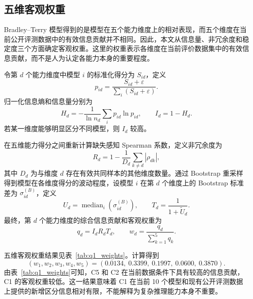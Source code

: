 \subsection{五维客观权重}

Bradley--Terry 模型得到的是模型在五个能力维度上的相对表现，而五个维度在当前公开评测数据中的有效信息贡献并不相同。因此，本文从信息量、非冗余度和稳定度三个方面确定客观权重。这里的权重表示各维度在当前评价数据集中的有效信息贡献，而不是人为认定各能力本身的重要程度。

令第 \(d\) 个能力维度中模型 \(i\) 的标准化得分为 \(S_{id}\)，定义
\begin{equation}
p_{id}
=
\frac{S_{id}+\varepsilon}
{\sum_i(S_{id}+\varepsilon)}.
\label{eq:q1_information_p}
\end{equation}
归一化信息熵和信息量分别为
\begin{equation}
H_d
=
-\frac{1}{\ln n_d}
\sum_i p_{id}\ln p_{id},
\qquad
I_d=1-H_d.
\label{eq:q1_information}
\end{equation}
若某一维度能够明显区分不同模型，则 \(I_d\) 较高。

在五维能力得分之间重新计算缺失感知 Spearman 系数，定义非冗余度为
\begin{equation}
R_d
=
1-
\frac{1}{D_d}
\sum_{k\neq d}
|\rho_{dk}|,
\label{eq:q1_redundancy}
\end{equation}
其中 \(D_d\) 为与维度 \(d\) 存在有效共同样本的其他维度数量。通过 Bootstrap 重采样得到模型在各维度得分的波动程度，设模型 \(i\) 在第 \(d\) 个维度上的 Bootstrap 标准差为 \(\sigma_{id}^{(B)}\)，定义
\begin{equation}
U_d
=
\operatorname{median}_i
\left(
\sigma_{id}^{(B)}
\right),
\qquad
T_d
=
\frac{1}{1+\widetilde U_d}.
\label{eq:q1_stability}
\end{equation}
最终，第 \(d\) 个能力维度的综合信息贡献和客观权重为
\begin{equation}
q_d=I_dR_dT_d,
\qquad
w_d
=
\frac{q_d}{\sum_{k=1}^{5}q_k}.
\label{eq:q1_dimension_weight}
\end{equation}

五维客观权重结果见表~\ref{tab:q1_weights}。计算得到
\[
(w_1,w_2,w_3,w_4,w_5)
=
(0.0134,\ 0.3399,\ 0.1997,\ 0.0600,\ 0.3870).
\]
由表~\ref{tab:q1_weights}可知，C5 和 C2 在当前数据条件下具有较高的信息贡献，C1 的客观权重较低。这一结果意味着 C1 在当前 10 个模型和现有公开评测数据上提供的新增区分信息相对有限，不能解释为复杂推理能力本身不重要。

